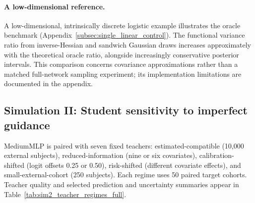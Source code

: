 \documentclass{article} %
\begin{document}
\paragraph{A low-dimensional reference.}
\label{sec:hj_results}
A low-dimensional, intrinsically discrete logistic example illustrates the oracle benchmark (Appendix~\ref{subsec:single_linear_control}). The functional variance ratio from inverse-Hessian and sandwich Gaussian draws increases approximately with the theoretical oracle ratio, alongside increasingly conservative posterior intervals. This comparison concerns covariance approximations rather than a matched full-network sampling experiment; its implementation limitations are documented in the appendix.

\subsection{Simulation II: Student sensitivity to imperfect guidance}
\label{sec:sim2_results}
MediumMLP is paired with seven fixed teachers: estimated-compatible (10,000 external subjects), reduced-information (nine or six covariates), calibration-shifted (logit offsets 0.25 or 0.50), risk-shifted (different covariate effects), and small-external-cohort (250 subjects). Each regime uses 50 paired target cohorts. Teacher quality and selected prediction and uncertainty summaries appear in Table~\ref{tab:sim2_teacher_regimes_full}.
\end{document}
